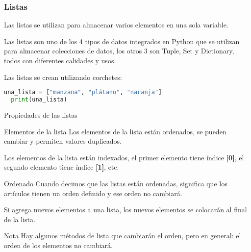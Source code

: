 \begin{frame}[fragile]
  \frametitle{Listas}

  \vspace{\baselineskip}
  Las listas se utilizan para almacenar varios elementos en una sola variable.

  \vspace{\baselineskip}
  Las listas son uno de los 4 tipos de datos integrados en Python que se
  utilizan para almacenar colecciones de datos, los otros 3 son Tuple,
  Set y Dictionary, todos con diferentes calidades y usos.

  \vspace{\baselineskip}
  Las listas se crean utilizando corchetes:

  \vspace{\baselineskip}
  \begin{lstlisting}[language=Python]
  una_lista = ["manzana", "plátano", "naranja"]
  print(una_lista) 
  \end{lstlisting}
\end{frame}

\begin{frame}[c]{Propiedades de las listas}

  \begin{block}{Elementos de la lista}
    Los elementos de la lista están ordenados, se pueden cambiar
    y permiten valores duplicados.

    Los elementos de la lista están indexados, el primer elemento tiene
    índice \textbf{[0]}, el segundo elemento tiene índice \textbf{[1]}, etc.
  \end{block}

  \pausa
  \begin{block}{Ordenado}
    Cuando decimos que las listas están ordenadas, significa que los
    artículos tienen un orden definido y ese orden no cambiará.

    Si agrega nuevos elementos a una lista, los nuevos elementos se
    colocarán al final de la lista.
  \end{block}

  \begin{alertblock}{Nota}
    Hay algunos métodos de lista que cambiarán el orden,
    pero en general: el orden de los elementos no cambiará. 
  \end{alertblock}
\end{frame}

